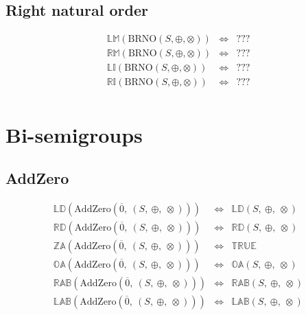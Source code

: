 \documentclass[10pt]{report}
\newcommand{\propname}[1]{{\mathbb{#1}}}
\begin{document}
\subsection{Right natural order}

\[
\begin{array}{rcl} 
\propname{LM}(\mathrm{BRNO}(S,\oplus,\otimes))
    & \Leftrightarrow %
    & ??? \\
\propname{RM}(\mathrm{BRNO}(S,\oplus,\otimes))
    & \Leftrightarrow %
    & ??? \\
\propname{LI}(\mathrm{BRNO}(S,\oplus,\otimes))
    & \Leftrightarrow %
    & ??? \\ 
\propname{RI}(\mathrm{BRNO}(S,\oplus,\otimes))
    & \Leftrightarrow %
    & ??? \\
\end{array} 
\] 


\section{Bi-semigroups}

\subsection{AddZero} 

\[
\begin{array}{rcl} 
\propname{LD}(\mathrm{AddZero}(\overline{0},\ (S,\ \oplus,\ \otimes))) 
    & \Leftrightarrow %
    & \propname{LD}(S,\ \oplus,\ \otimes) \\
\propname{RD}(\mathrm{AddZero}(\overline{0},\ (S,\ \oplus,\ \otimes))) 
    & \Leftrightarrow %
    & \propname{RD}(S,\ \oplus,\ \otimes) \\
\propname{ZA}(\mathrm{AddZero}(\overline{0},\ (S,\ \oplus,\ \otimes))) 
    & \Leftrightarrow %
    & \propname{TRUE}\\ 
\propname{OA}(\mathrm{AddZero}(\overline{0},\ (S,\ \oplus,\ \otimes))) 
    & \Leftrightarrow %
    & \propname{OA}(S,\ \oplus,\ \otimes) \\
\propname{RAB}(\mathrm{AddZero}(\overline{0},\ (S,\ \oplus,\ \otimes))) 
    & \Leftrightarrow %
    & \propname{RAB}(S,\ \oplus,\ \otimes)\\ 
\propname{LAB}(\mathrm{AddZero}(\overline{0},\ (S,\ \oplus,\ \otimes))) 
    & \Leftrightarrow %
    & \propname{LAB}(S,\ \oplus,\ \otimes)\\ 
\end{array} 
\] 
\end{document}
